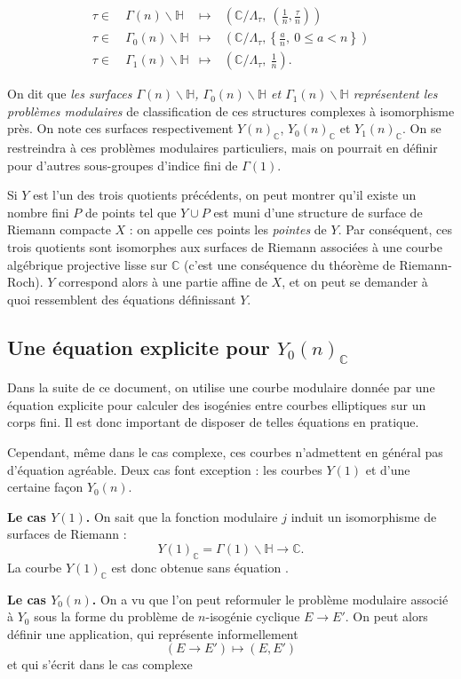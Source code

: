 \documentclass[11pt,a4paper]{article}
\newcommand{\C}{\mathbb{C}}
\renewcommand{\H}{\mathbb{H}}
\renewcommand{\b}{\backslash}
\newcommand{\vers}{\longrightarrow}
\theoremstyle{definition}
\begin{document}
$$\begin{aligned}
\tau\in\ &\Gamma(n)\b \H &\longmapsto\ &\left(\C/\Lambda_\tau,\ \left(\frac{1}{n},\frac{\tau}{n}\right)\right) \\
\tau\in\ &\Gamma_0(n)\b \H &\longmapsto\ &\left(\C/\Lambda_\tau, \left\{\frac{a}{n},\ 0\leq a<n\right\} \right) \\
\tau\in\ &\Gamma_1(n)\b \H &\longmapsto\ &\left(\C/\Lambda_\tau,\ \frac{1}{n}\right).
\end{aligned}$$

On dit que \emph{les surfaces $\Gamma(n)\b \H$, $\Gamma_0(n)\b \H$ et $\Gamma_1(n)\b \H$ représentent les problèmes modulaires} de classification de ces structures complexes à isomorphisme près. On note ces surfaces respectivement $Y(n)_\C$, $Y_0(n)_\C$ et $Y_1(n)_\C$. On se restreindra à ces problèmes modulaires particuliers, mais on pourrait en définir pour d'autres sous-groupes d'indice fini de $\Gamma(1)$.

Si $Y$ est l'un des trois quotients précédents, on peut montrer qu'il existe un nombre fini $P$ de points tel que $Y\cup P$ est muni d'une structure de surface de Riemann compacte $X$ : on appelle ces points les \emph{pointes} de $Y$. Par conséquent, ces trois quotients sont isomorphes aux surfaces de Riemann associées à une courbe algébrique projective lisse sur $\C$ (c'est une conséquence du théorème de Riemann-Roch). $Y$ correspond alors à une partie affine de $X$, et on peut se demander à quoi ressemblent des équations définissant $Y$.


\subsection{Une équation explicite pour $Y_0(n)_\C$}


Dans la suite de ce document, on utilise une courbe modulaire donnée par une équation explicite pour calculer des isogénies entre courbes elliptiques sur un corps fini. Il est donc important de disposer de telles équations en pratique.

Cependant, même dans le cas complexe, ces courbes n'admettent en général pas d'équation agréable. Deux cas font exception : les courbes $Y(1)$ et d'une certaine façon $Y_0(n)$.

\textbf{Le cas $Y(1)$.} On sait que la fonction modulaire $j$ induit un isomorphisme de surfaces de Riemann :
$$Y(1)_\C = \Gamma(1)\b \H \vers \C.$$
La courbe $Y(1)_\C$ est donc obtenue \og sans équation \fg.

\textbf{Le cas $Y_0(n)$.} On a vu que l'on peut reformuler le problème modulaire associé à $Y_0$ sous la forme du problème de $n$-isogénie cyclique $E\vers E'$. On peut alors définir une application, qui représente informellement
$$(E\vers E') \longmapsto (E, E')$$
et qui s'écrit dans le cas complexe
\end{document}
